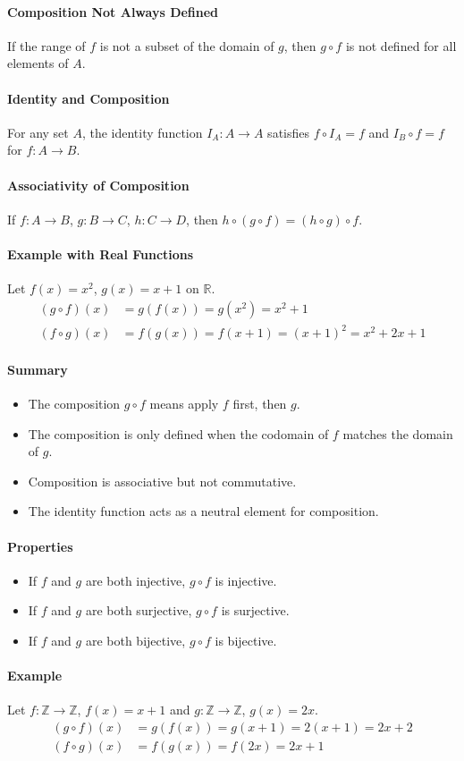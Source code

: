 \paragraph*{Composition Not Always Defined}
If the range of $f$ is not a subset of the domain of $g$, then $g \circ f$ is not defined for all elements of $A$.

\paragraph*{Identity and Composition}
For any set $A$, the identity function $I_A: A \to A$ satisfies $f \circ I_A = f$ and $I_B \circ f = f$ for $f: A \to B$.

\paragraph*{Associativity of Composition}
If $f: A \to B$, $g: B \to C$, $h: C \to D$, then $h \circ (g \circ f) = (h \circ g) \circ f$.

\paragraph*{Example with Real Functions}
Let $f(x) = x^2$, $g(x) = x+1$ on $\mathbb{R}$.
\begin{align*}
    (g \circ f)(x) &= g(f(x)) = g(x^2) = x^2 + 1 \\
    (f \circ g)(x) &= f(g(x)) = f(x+1) = (x+1)^2 = x^2 + 2x + 1
\end{align*}

\paragraph*{Summary}
\begin{itemize}
    \item The composition $g \circ f$ means apply $f$ first, then $g$.
    \item The composition is only defined when the codomain of $f$ matches the domain of $g$.
    \item Composition is associative but not commutative.
    \item The identity function acts as a neutral element for composition.
\end{itemize}

\paragraph*{Properties}
\begin{itemize}
    \item If $f$ and $g$ are both injective, $g \circ f$ is injective.
    \item If $f$ and $g$ are both surjective, $g \circ f$ is surjective.
    \item If $f$ and $g$ are both bijective, $g \circ f$ is bijective.
\end{itemize}

\paragraph*{Example}
Let $f: \mathbb{Z} \to \mathbb{Z}$, $f(x) = x + 1$ and $g: \mathbb{Z} \to \mathbb{Z}$, $g(x) = 2x$.
\begin{align*}
    (g \circ f)(x) &= g(f(x)) = g(x+1) = 2(x+1) = 2x + 2 \\
    (f \circ g)(x) &= f(g(x)) = f(2x) = 2x + 1
\end{align*}
